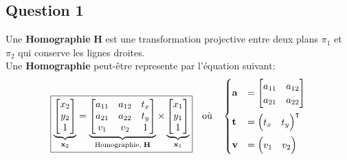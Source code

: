 \documentclass[../5RO17_TP1.tex]{subfiles}
\begin{document}
\subsection{Question 1}
\begin{definition}
    Une \textbf{Homographie} $\mathbf{H}$ est une transformation projective entre deux plans $\pi_1$ et $\pi_2$ qui conserve les lignes droites.\\
    
    \noindent Une \textbf{Homographie} peut-être represente par l'équation suivant:
    \begin{equation}
        \boxed{
            \underbrace{
                \begin{bmatrix}
                x_2\\ y_2\\ 1
                \end{bmatrix}
            }_{\mathbf{x}_{2}}
            =
            \underbrace{
                \begin{bmatrix}
                    a_{11} & a_{12} & t_x\\
                    a_{21} & a_{22} & t_y\\
                    v_1    & v_2    & 1\\
                \end{bmatrix}
            }_{\text{Homographie},\;\mathbf{H}}
            \times
            \underbrace{
                \begin{bmatrix}
                    x_1\\ y_1\\ 1
                \end{bmatrix}
            }_{\mathbf{x}_{1}}
        }
        \quad
        \text{où}
        \quad
        \begin{cases}
            \mathbf{a} &= \begin{bmatrix}
                a_{11} & a_{12}\\
                a_{21} & a_{22}\\
            \end{bmatrix}\vspace{2mm}\\
            \mathbf{t} &= \begin{pmatrix} t_{x} & t_{y} \end{pmatrix}^{\intercal}\vspace{2mm}\\
            \mathbf{v} &= \begin{pmatrix} v_{1} & v_{2} \end{pmatrix}

\end{cases}
\end{equation}
\end{definition}
\end{document}
